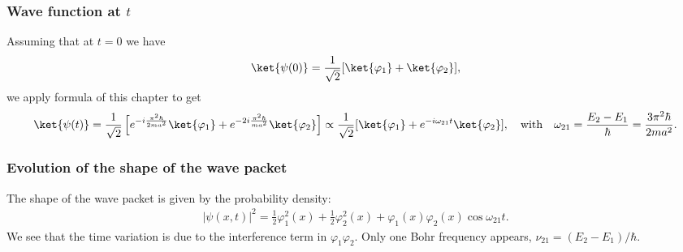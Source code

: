 \subsubsection{Wave function at $t$}
Assuming that at $t=0$ we have 
\begin{align*}
    \ket{\psi(0)}=\frac{1}{\sqrt{2}}[\ket{\varphi_1}+\ket{\varphi_2}],
\end{align*}
we apply formula of this chapter to get 
\begin{align*}
    \ket{\psi(t)}=\frac{1}{\sqrt{2}}\left[e^{-i\frac{\pi^2\hbar}{2ma^2}}\ket{\varphi_1}+e^{-2i\frac{\pi^2\hbar}{ma^2}}\ket{\varphi_2}\right]\propto\frac{1}{\sqrt{2}}[\ket{\varphi_1}+e^{-i\omega_{21}t}\ket{\varphi_2}],\quad\text{with}\quad\omega_{21}=\frac{E_2-E_1}{\hbar}=\frac{3\pi^2\hbar}{2ma^2}.
\end{align*}
%
\subsubsection{Evolution of the shape of the wave packet}
The shape of the wave packet is given by the probability density:
\begin{align*}
    |\psi(x,t)|^2=\frac{1}{2}\varphi_1^2(x)+\frac{1}{2}\varphi_2^2(x)+\varphi_1(x)\varphi_2(x)\cos\omega_{21}t.
\end{align*}
We see that the time variation is due to the interference term in $\varphi_1\varphi_2$. Only one Bohr frequency appears, $\nu_{21}=(E_2-E_1)/\hbar$.

%
